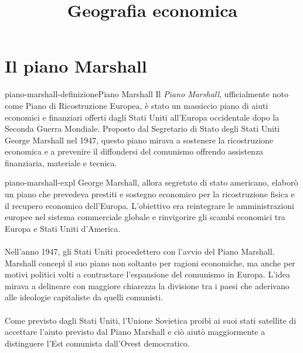 \documentclass[preview]{standalone}
\begin{document}
\title{Geografia economica}
\genpage

\section{Il piano Marshall}

\begin{snippetdefinition}{piano-marshall-definizione}{Piano Marshall}
    Il \textit{Piano Marshall}, ufficialmente noto come Piano di Ricostruzione Europea,
    è stato un massiccio piano di aiuti economici e finanziari offerti dagli Stati Uniti
    all'Europa occidentale dopo la Seconda Guerra Mondiale.
    Proposto dal Segretario di Stato degli Stati Uniti George Marshall nel 1947,
    questo piano mirava a sostenere la ricostruzione economica e a prevenire
    il diffondersi del comunismo offrendo assistenza finanziaria, materiale e tecnica.
\end{snippetdefinition}

\begin{snippet}{piano-marshall-expl}
    George Marshall, allora segretato di stato americano, elaborò un piano che prevedeva prestiti e sostegno economico
    per la ricostruzione fisica e il recupero economico dell'Europa. L'obiettivo era reintegrare le amministrazioni
    europee nel sistema commerciale globale e rinvigorire gli scambi economici tra Europa e Stati Uniti d'America.
    \\\\
    Nell'anno 1947, gli Stati Uniti procedettero con l'avvio del Piano Marshall.
    Marshall concepì il suo piano non soltanto per ragioni economiche, ma anche per motivi politici volti a contrastare
    l'espansione del comunismo in Europa. L'idea mirava a delineare con maggiore chiarezza la divisione tra i paesi
    che aderivano alle ideologie capitaliste da quelli comunisti.
    \\\\
    Come previsto dagli Stati Uniti, l'Unione Sovietica proibì ai suoi stati satellite di accettare l'aiuto previsto dal
    Piano Marshall e ciò aiutò maggiormente a distinguere l'Est comunista dall'Ovest democratico.
\end{snippet}
\end{document}
